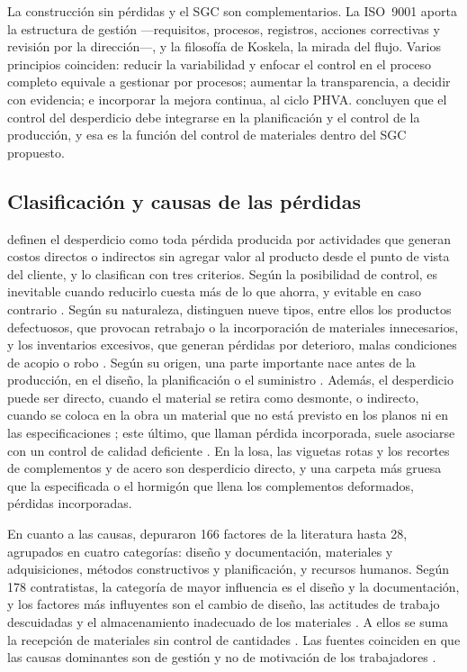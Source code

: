 La construcción sin pérdidas y el SGC son complementarios. La ISO~9001 aporta la estructura de gestión ---requisitos, procesos, registros, acciones correctivas y revisión por la dirección---, y la filosofía de Koskela, la mirada del flujo. Varios principios coinciden: reducir la variabilidad y enfocar el control en el proceso completo equivale a gestionar por procesos; aumentar la transparencia, a decidir con evidencia; e incorporar la mejora continua, al ciclo PHVA. \textcite[p.~334]{formoso1999} concluyen que el control del desperdicio debe integrarse en la planificación y el control de la producción, y esa es la función del control de materiales dentro del SGC propuesto.

\subsection{Clasificación y causas de las pérdidas}

\textcite[p.~328]{formoso1999} definen el desperdicio como toda pérdida producida por actividades que generan costos directos o indirectos sin agregar valor al producto desde el punto de vista del cliente, y lo clasifican con tres criterios. Según la posibilidad de control, es inevitable cuando reducirlo cuesta más de lo que ahorra, y evitable en caso contrario \parencite[p.~328]{formoso1999}. Según su naturaleza, distinguen nueve tipos, entre ellos los productos defectuosos, que provocan retrabajo o la incorporación de materiales innecesarios, y los inventarios excesivos, que generan pérdidas por deterioro, malas condiciones de acopio o robo \parencite[p.~329]{formoso1999}. Según su origen, una parte importante nace antes de la producción, en el diseño, la planificación o el suministro \parencite[p.~327]{formoso1999}. Además, el desperdicio puede ser directo, cuando el material se retira como desmonte, o indirecto, cuando se coloca en la obra un material que no está previsto en los planos ni en las especificaciones \parencite[p.~15]{ccoyllo2016}; este último, que \textcite[p.~106]{maciel2016} llaman pérdida incorporada, suele asociarse con un control de calidad deficiente \parencite[pp.~15--16]{ccoyllo2016}. En la losa, las viguetas rotas y los recortes de complementos y de acero son desperdicio directo, y una carpeta más gruesa que la especificada o el hormigón que llena los complementos deformados, pérdidas incorporadas.

En cuanto a las causas, \textcite[pp.~1, 9]{luangcharoenrat2019} depuraron 166 factores de la literatura hasta 28, agrupados en cuatro categorías: diseño y documentación, materiales y adquisiciones, métodos constructivos y planificación, y recursos humanos. Según 178 contratistas, la categoría de mayor influencia es el diseño y la documentación, y los factores más influyentes son el cambio de diseño, las actitudes de trabajo descuidadas y el almacenamiento inadecuado de los materiales \parencite[pp.~12--13]{luangcharoenrat2019}. A ellos se suma la recepción de materiales sin control de cantidades \parencite[p.~32]{ccoyllo2016}. Las fuentes coinciden en que las causas dominantes son de gestión y no de motivación de los trabajadores \parencite[p.~327]{formoso1999}.

